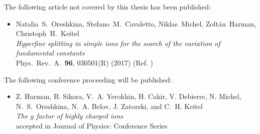 \noindent
The following article not covered by this thesis has been published:

\begin{itemize}
\item Natalia~S.~Oreshkina, Stefano~M.~Cavaletto, Niklas~Michel, Zoltán~Harman,\\Christoph~H.~Keitel \\ 
\textit{Hyperfine splitting in simple ions for the search of the variation of fundamental constants} \\ 
Phys.~Rev.~A.~\textbf{96}, 030501(R) (2017) (Ref. \cite{oreshkina2017}) \vspace*{1pt} \\
\end{itemize} 

\noindent
The following conference proceeding will be published:

\begin{itemize}
\item Z. Harman, B. Sikora, V.~A. Yerokhin, H. Cakir, V. Debierre, N. Michel, N.~S.~Oreshkina, N.~A. Belov, J. Zatorski, and C.~H. Keitel \\ 
\textit{The $g$ factor of highly charged ions} \\
accepted in Journal of Physics: Conference Series
\end{itemize} 

\thispagestyle{empty}
